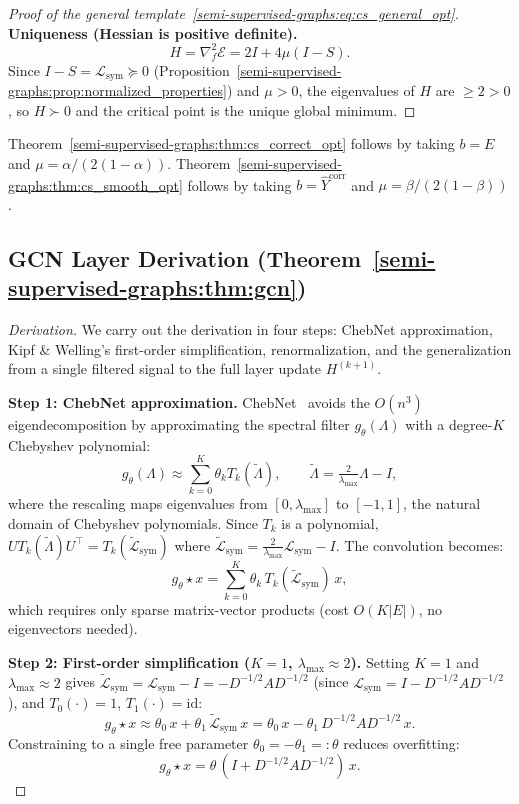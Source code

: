 \begin{notechapter}
\begin{proof}[Proof of the general template~\eqref{semi-supervised-graphs:eq:cs_general_opt}]
\textbf{Uniqueness (Hessian is positive definite).}
\[
H = \nabla^2_f \mathcal{E} = 2I + 4\mu(I - S).
\]
Since $I - S = \mathcal{L}_{\mathrm{sym}} \succeq 0$
(Proposition~\ref{semi-supervised-graphs:prop:normalized_properties}) and $\mu > 0$, the eigenvalues
of $H$ are $\geq 2 > 0$, so $H \succ 0$ and the critical point is the unique
global minimum.
\end{proof}

Theorem~\ref{semi-supervised-graphs:thm:cs_correct_opt} follows by taking $b = E$ and
$\mu = \alpha/(2(1-\alpha))$. Theorem~\ref{semi-supervised-graphs:thm:cs_smooth_opt} follows by
taking $b = \hat{Y}^{\text{corr}}$ and $\mu = \beta/(2(1-\beta))$.

\subsection{GCN Layer Derivation (Theorem~\ref{semi-supervised-graphs:thm:gcn})}
\label{semi-supervised-graphs:app:gcn_derivation}

\begin{proof}[Derivation]
We carry out the derivation in four steps: ChebNet approximation, Kipf \&
Welling's first-order simplification, renormalization, and the generalization
from a single filtered signal to the full layer update $H^{(k+1)}$.

\textbf{Step 1: ChebNet approximation.}
ChebNet~\cite{semi-supervised-graphs:defferrard2016} avoids the $O(n^3)$ eigendecomposition by
approximating the spectral filter $g_\theta(\Lambda)$ with a degree-$K$
Chebyshev polynomial:
\[
g_\theta(\Lambda) \approx \sum_{k=0}^K \theta_k T_k(\tilde{\Lambda}), \qquad
\tilde{\Lambda} = \tfrac{2}{\lambda_{\max}}\Lambda - I,
\]
where the rescaling maps eigenvalues from $[0, \lambda_{\max}]$ to $[-1,1]$,
the natural domain of Chebyshev polynomials. Since $T_k$ is a polynomial,
$U T_k(\tilde\Lambda) U^\top = T_k(\tilde{\mathcal{L}}_{\mathrm{sym}})$ where
$\tilde{\mathcal{L}}_{\mathrm{sym}} = \frac{2}{\lambda_{\max}}\mathcal{L}_{\mathrm{sym}}
- I$. The convolution becomes:
\[
g_\theta \star x = \sum_{k=0}^K \theta_k\, T_k(\tilde{\mathcal{L}}_{\mathrm{sym}})\,x,
\]
which requires only sparse matrix-vector products (cost $O(K|E|)$, no
eigenvectors needed).

\textbf{Step 2: First-order simplification ($K=1$, $\lambda_{\max} \approx 2$).}
Setting $K=1$ and $\lambda_{\max} \approx 2$ gives
$\tilde{\mathcal{L}}_{\mathrm{sym}} = \mathcal{L}_{\mathrm{sym}} - I
= -D^{-1/2}AD^{-1/2}$ (since $\mathcal{L}_{\mathrm{sym}} = I - D^{-1/2}AD^{-1/2}$),
and $T_0(\cdot) = 1$, $T_1(\cdot) = \text{id}$:
\[
g_\theta \star x \approx \theta_0\,x + \theta_1\,\tilde{\mathcal{L}}_{\mathrm{sym}}\,x
= \theta_0\,x - \theta_1\,D^{-1/2}AD^{-1/2}\,x.
\]
Constraining to a single free parameter $\theta_0 = -\theta_1 =: \theta$
reduces overfitting:
\[
g_\theta \star x = \theta\,(I + D^{-1/2}AD^{-1/2})\,x.
\]


\end{proof}
\end{notechapter}
